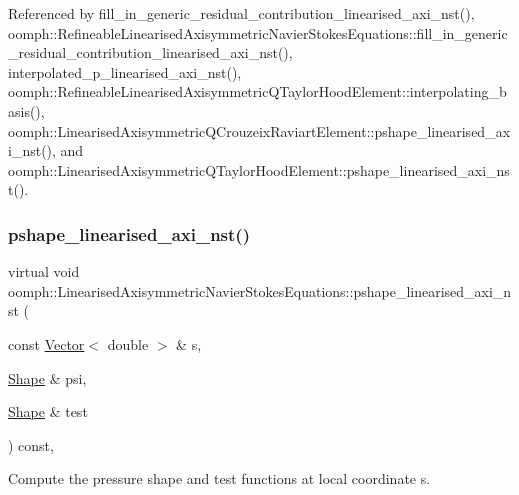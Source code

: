 Referenced by fill\+\_\+in\+\_\+generic\+\_\+residual\+\_\+contribution\+\_\+linearised\+\_\+axi\+\_\+nst(), oomph\+::\+Refineable\+Linearised\+Axisymmetric\+Navier\+Stokes\+Equations\+::fill\+\_\+in\+\_\+generic\+\_\+residual\+\_\+contribution\+\_\+linearised\+\_\+axi\+\_\+nst(), interpolated\+\_\+p\+\_\+linearised\+\_\+axi\+\_\+nst(), oomph\+::\+Refineable\+Linearised\+Axisymmetric\+Q\+Taylor\+Hood\+Element\+::interpolating\+\_\+basis(), oomph\+::\+Linearised\+Axisymmetric\+Q\+Crouzeix\+Raviart\+Element\+::pshape\+\_\+linearised\+\_\+axi\+\_\+nst(), and oomph\+::\+Linearised\+Axisymmetric\+Q\+Taylor\+Hood\+Element\+::pshape\+\_\+linearised\+\_\+axi\+\_\+nst().

\mbox{\label{classoomph_1_1LinearisedAxisymmetricNavierStokesEquations_ae2f6cf4a374c45a35ac1bea04ffced1f}} 
\subsubsection{\texorpdfstring{pshape\+\_\+linearised\+\_\+axi\+\_\+nst()}{pshape\_linearised\_axi\_nst()}\hspace{0.1cm}{\footnotesize\ttfamily [2/2]}}
{\footnotesize\ttfamily virtual void oomph\+::\+Linearised\+Axisymmetric\+Navier\+Stokes\+Equations\+::pshape\+\_\+linearised\+\_\+axi\+\_\+nst (\begin{DoxyParamCaption}\item[{const \hyperlink{classoomph_1_1Vector}{Vector}$<$ double $>$ \&}]{s,  }\item[{\hyperlink{classoomph_1_1Shape}{Shape} \&}]{psi,  }\item[{\hyperlink{classoomph_1_1Shape}{Shape} \&}]{test }\end{DoxyParamCaption}) const\hspace{0.3cm}{\ttfamily [protected]}, {}}



Compute the pressure shape and test functions at local coordinate s. 



